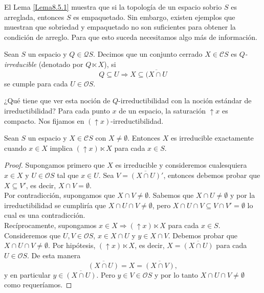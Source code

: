 El Lema \ref{Lema8.5.1} muestra que si la topología de un espacio sobrio $S$ es arreglada, entonces $S$ es empaquetado. Sin embargo, existen ejemplos que muestran que sobriedad y empaquetado no son suficientes para obtener la condición de arreglo. Para que esto suceda necesitamos algo más de información.

\begin{dfn}\label{Definicion8.5.3}
    Sean $S$ un espacio y $Q\in \mathcal{Q}S$. Decimos que un conjunto cerrado $X\in \mathcal{C}S$ es \emph{$Q$-irreducible} (denotado por $Q\ltimes X$), si 
    \[
    Q\subseteq U\Rightarrow X\subseteq \overline{(X\cap U}
    \]
    se cumple para cada $U\in \mathcal{O}S$.
\end{dfn}

¿Qué tiene que ver esta noción de $Q$-irreductibilidad con la noción estándar de irreductibilidad? Para cada punto $x$ de un espacio, la saturación $\uparrow x$ es compacto. Nos fijamos en $(\uparrow x)$-irreductibilidad.

\begin{lem}\label{Lema8.5.4}
    Sean $S$ un espacio y $X\in \mathcal{C}S$ con $X\neq \emptyset$. Entonces $X$ es irreducible exactamente cuando $x\in X$  implica $(\uparrow x)\ltimes X$ para cada $x\in S$.
\end{lem}

\begin{proof}
    Supongamos primero que $X$ es irreducible y consideremos cualesquiera $x\in X$ y $U\in \mathcal{O}S$ tal que $x\in U$. Sea $V=\overline{(X\cap U)}'$, entonces debemos probar que $X\subseteq V'$, es decir, $X\cap V=\emptyset$.\\

    Por contradicción, supongamos que $X\cap V\neq \emptyset$. Sabemos que $X\cap U\neq \emptyset$ y por la irreductibilidad se cumpliría que $X\cap U\cap V\neq \emptyset$, pero $X\cap U\cap V\subseteq V\cap V'=\emptyset$ lo cual es una contradicción.\\

    Recíprocamente, supongamos $x\in X\Rightarrow (\uparrow x)\ltimes X$ para cada $x\in S$. Consideremos que $U, V\in \mathcal{O}S$, $x\in X\cap U$ y $y\in X\cap V$. Debemos probar que $X\cap U\cap V\neq \emptyset$. Por hipótesis, $(\uparrow x)\ltimes X$, es decir, $X=\overline{(X\cap U)}$ para cada $U\in \mathcal{O}S$. De esta manera 
    \[
    \overline{(X\cap U)}=X=\overline{(X\cap V)},
    \]
    y en particular $y\in \overline{(X\cap U)}$. Pero $y\in V\in \mathcal{O}S$ y por lo tanto $X\cap U\cap V\neq \emptyset$ como requeríamos. 
\end{proof}

